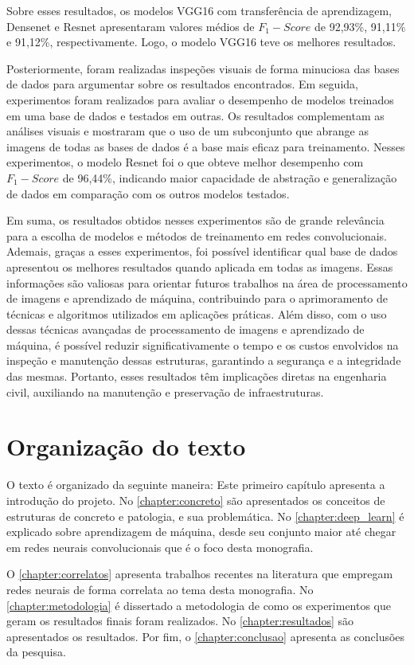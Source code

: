 Sobre esses resultados, os modelos VGG16 com transferência de aprendizagem, Densenet e Resnet apresentaram valores médios de $F_{1}-Score$ de 92,93\%, 91,11\% e 91,12\%, respectivamente.
Logo, o modelo VGG16 teve os melhores resultados.

Posteriormente, foram realizadas inspeções visuais de forma minuciosa das bases de dados para argumentar sobre os resultados encontrados.
Em seguida, experimentos foram realizados para avaliar o desempenho de modelos treinados em uma base de dados e testados em outras. 
Os resultados complementam  as análises visuais e mostraram que o uso de um subconjunto que abrange as imagens de todas as bases de dados é a base mais eficaz para treinamento. 
Nesses experimentos, o modelo Resnet foi o que obteve melhor desempenho com $F_{1}-Score$ de 96,44\%, indicando maior capacidade de abstração e generalização de dados em comparação com os outros modelos testados. 


Em suma, os resultados obtidos nesses experimentos são de grande relevância para a escolha de modelos e métodos de treinamento em redes convolucionais. 
Ademais, graças a esses experimentos, foi possível identificar qual base de dados apresentou os melhores resultados quando aplicada em todas as imagens. 
Essas informações são valiosas para orientar futuros trabalhos na área de processamento de imagens e aprendizado de máquina, contribuindo para o aprimoramento de técnicas e algoritmos utilizados em aplicações práticas.
Além disso, com o uso dessas técnicas avançadas de processamento de imagens e aprendizado de máquina, é possível reduzir significativamente o tempo e os custos envolvidos na inspeção e manutenção dessas estruturas, garantindo a segurança e a integridade das mesmas. 
Portanto, esses resultados têm implicações diretas na engenharia civil, auxiliando na manutenção e preservação de infraestruturas.

\section{Organização do texto}

O texto é organizado da seguinte maneira: Este primeiro capítulo apresenta a introdução do projeto. 
No \autoref{chapter:concreto} são apresentados os conceitos de estruturas de concreto e patologia, e sua problemática. 
No \autoref{chapter:deep_learn} é explicado sobre aprendizagem de máquina, desde seu conjunto maior até chegar em redes neurais convolucionais que é o foco desta monografia.

O \autoref{chapter:correlatos} apresenta trabalhos recentes na literatura que empregam redes neurais de forma correlata ao tema desta monografia.
No \autoref{chapter:metodologia} é dissertado a metodologia de como os experimentos que geram os resultados finais foram realizados.
No \autoref{chapter:resultados} são apresentados os resultados.
Por fim, o \autoref{chapter:conclusao} apresenta as conclusões da pesquisa.